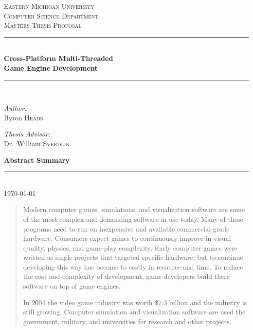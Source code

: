 \documentclass[12pt,a4paper,oneside]{report}
\newcommand{\HRule}{\rule{\linewidth}{0.5mm}}
\begin{document}
\begin{titlepage}
    \begin{center}
        \textsc{\large Eastern Michigan University}\\[1.5cm]
        \textsc{\large Computer Science Department}\\
        \textsc{\large Masters Thesis Proposal}\\[0.5cm]
        \HRule\\[0.4cm]
        { \huge \bfseries Cross-Platform Multi-Threaded \\
            Game Engine Development }\\[0.4cm]
        \HRule\\[1.5cm]

        \begin{minipage}{0.4\textwidth}
            \begin{flushleft} \large
                \emph{Author:}\\
                Byron \textsc{Heads}
            \end{flushleft}
        \end{minipage}
        \begin{minipage}{0.4\textwidth}
            \begin{flushright} \large
                \emph{Thesis Advisor:} \\
                    Dr.~William \textsc{Sverdlik}
            \end{flushright}
        \end{minipage}

        \vfill
        { \large \textbf{Abstract Summary}}\\
    
        \HRule\\[0.5cm]
        { \large \today }
    \end{center}
\end{titlepage}

\begin{abstract}
Modern computer games, simulations, and visualization software are some of the most complex and demanding software in use today.  Many of these programs need to run on inexpensive and available commercial-grade hardware.  Consumers expect games to continuously improve in visual quality, physics, and game-play complexity.  Early computer games were written as single projects that targeted specific hardware, but to continue developing this way has become to costly in resource and time.  To reduce the cost and complexity of development, game developers build there software on top of game engines.

In $2004$ the video game industry was worth \$$7.3$ billion and the industry is still growing.  Computer simulation and visualization software are used the government, military, and universities for research and other projects.  

\end{abstract}
\end{document}
